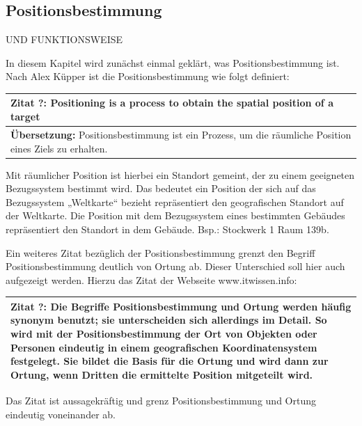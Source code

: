 \subsection{Positionsbestimmung}
UND FUNKTIONSWEISE


In diesem Kapitel wird zunächst einmal geklärt, was Positionsbestimmung ist. 
Nach Alex Küpper ist die Positionsbestimmung wie folgt definiert:

\begin{table}[h]
	\centering
	\begin{tabular}{|p{16cm}|}\hline
		\textbf{Zitat ?:} \glqq Positioning is a process to obtain the spatial position of a target \grqq  \cite[S.121]{Kuepper2005} \\ \hline
		\textbf{Übersetzung:} Positionsbestimmung ist ein Prozess, um die räumliche Position eines Ziels zu erhalten. \\ \hline
	\end{tabular}
\end{table}

Mit räumlicher Position ist hierbei ein Standort gemeint, der zu einem geeigneten Bezugssystem bestimmt wird. Das bedeutet ein Position der sich auf das Bezugssystem „Weltkarte“ bezieht repräsentiert den geografischen Standort auf der Weltkarte. Die Position mit dem Bezugssystem eines bestimmten Gebäudes repräsentiert den Standort in dem Gebäude. Bsp.: Stockwerk 1 Raum 139b.

Ein weiteres Zitat bezüglich der Positionsbestimmung grenzt den Begriff Positionsbestimmung deutlich von Ortung ab. Dieser Unterschied soll hier auch aufgezeigt werden. Hierzu das Zitat der Webseite www.itwissen.info:

\begin{table}[h]
	\centering
	\begin{tabular}{|p{16cm}|}\hline
		\textbf{Zitat ?:} \glqq Die Begriffe Positionsbestimmung und Ortung werden häufig synonym benutzt; sie unterscheiden sich allerdings im Detail. So wird mit der Positionsbestimmung der Ort von Objekten oder Personen eindeutig in einem geografischen Koordinatensystem festgelegt. Sie bildet die Basis für die Ortung und wird dann zur Ortung, wenn Dritten die ermittelte Position mitgeteilt wird. \grqq  \cite[Positionsbestimmung]{itwissen} \\ \hline
	\end{tabular}
\end{table}

Das Zitat ist aussagekräftig und grenz Positionsbestimmung und Ortung eindeutig voneinander ab.

